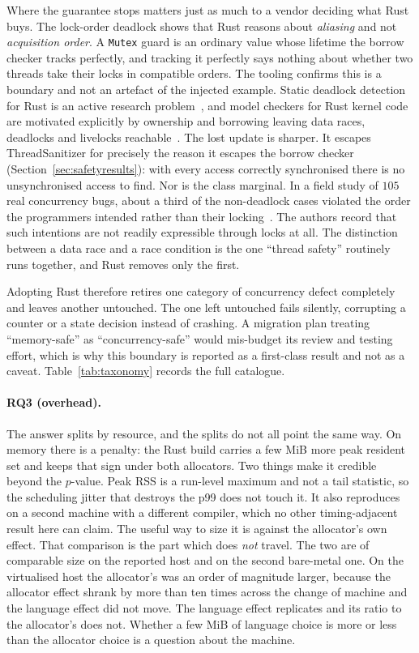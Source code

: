 \documentclass[english,oneside,a4paper,censored,csm,software-track-2020]{HYthesisML}
\begin{document}
Where the guarantee stops matters just as much to a vendor deciding what Rust buys. The
lock-order deadlock shows that Rust reasons about \emph{aliasing} and not \emph{acquisition
order}. A \texttt{Mutex} guard is an ordinary value whose lifetime the borrow checker tracks
perfectly, and tracking it perfectly says nothing about whether two threads take their locks in
compatible orders. The tooling confirms this is a boundary and not an artefact of the injected
example. Static deadlock detection for Rust is an active research problem~\cite{zhang2026deadlock},
and model checkers for Rust kernel code are motivated explicitly by ownership and borrowing leaving
data races, deadlocks and livelocks reachable~\cite{tang2025converos}. The lost update is
sharper. It escapes ThreadSanitizer for precisely the reason it escapes the borrow checker
(Section~\ref{sec:safetyresults}): with every access correctly synchronised there is no
unsynchronised access to find. Nor is the class marginal. In a field study of $105$ real concurrency bugs, about a third of the non-deadlock cases
violated the order the programmers intended rather than their locking~\cite{lu2008mistakes}.
The authors record that such intentions are not readily expressible through locks at all. The distinction between a data race and a
race condition is the one ``thread safety'' routinely runs together, and Rust removes only the
first.

Adopting Rust therefore retires one category of concurrency defect completely and leaves another
untouched. The one left untouched fails silently, corrupting a counter or a state decision
instead of crashing. A migration plan treating ``memory-safe'' as ``concurrency-safe'' would
mis-budget its review and testing effort, which is why this boundary is reported as a first-class
result and not as a caveat. Table~\ref{tab:taxonomy} records the full catalogue.

\paragraph{RQ3 (overhead).} The answer splits by resource, and the splits do not all point the
same way. On memory there is a penalty: the Rust build carries a few MiB more peak resident set
and keeps that sign under both allocators. Two things make it credible beyond the $p$-value.
Peak RSS is a run-level maximum and not a tail statistic, so the scheduling jitter that destroys
the p99 does not touch it. It also reproduces on a second machine with a different compiler, which
no other timing-adjacent result here can claim. The useful way to size it is against the allocator's own effect. That comparison is the part
which does \emph{not} travel. The two are of comparable size on the reported host and on the second
bare-metal one. On the virtualised host the allocator's was an order of magnitude larger, because
the allocator effect shrank by more than ten times across the change of machine and the language
effect did not move. The language effect replicates and its ratio to the allocator's does not.
Whether a few MiB of language choice is more or less than the allocator choice is a question
about the machine.
\end{document}
